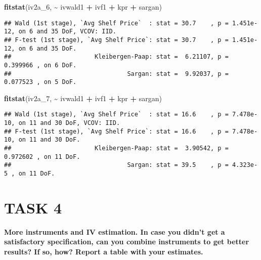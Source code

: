 \documentclass[
]{article}
\newenvironment{Shaded}{\begin{snugshade}}{\end{snugshade}}
\newcommand{\FunctionTok}[1]{\textcolor[rgb]{0.13,0.29,0.53}{\textbf{#1}}}
\newcommand{\NormalTok}[1]{#1}
\newcommand{\SpecialCharTok}[1]{\textcolor[rgb]{0.81,0.36,0.00}{\textbf{#1}}}
\begin{document}
\begin{Shaded}
\begin{Highlighting}[]
\FunctionTok{fitstat}\NormalTok{(iv2a\_6, }\SpecialCharTok{\textasciitilde{}}\NormalTok{ ivwald1 }\SpecialCharTok{+}\NormalTok{ ivf1 }\SpecialCharTok{+}\NormalTok{ kpr }\SpecialCharTok{+}\NormalTok{ sargan)}
\end{Highlighting}
\end{Shaded}

\begin{verbatim}
## Wald (1st stage), `Avg Shelf Price`  : stat = 30.7    , p = 1.451e-12, on 6 and 35 DoF, VCOV: IID.
## F-test (1st stage), `Avg Shelf Price`: stat = 30.7    , p = 1.451e-12, on 6 and 35 DoF.
##                       Kleibergen-Paap: stat =  6.21107, p = 0.399966 , on 6 DoF.
##                                Sargan: stat =  9.92037, p = 0.077523 , on 5 DoF.
\end{verbatim}

\begin{Shaded}
\begin{Highlighting}[]
\FunctionTok{fitstat}\NormalTok{(iv2a\_7, }\SpecialCharTok{\textasciitilde{}}\NormalTok{ ivwald1 }\SpecialCharTok{+}\NormalTok{ ivf1 }\SpecialCharTok{+}\NormalTok{ kpr }\SpecialCharTok{+}\NormalTok{ sargan)}
\end{Highlighting}
\end{Shaded}

\begin{verbatim}
## Wald (1st stage), `Avg Shelf Price`  : stat = 16.6    , p = 7.478e-10, on 11 and 30 DoF, VCOV: IID.
## F-test (1st stage), `Avg Shelf Price`: stat = 16.6    , p = 7.478e-10, on 11 and 30 DoF.
##                       Kleibergen-Paap: stat =  3.90542, p = 0.972602 , on 11 DoF.
##                                Sargan: stat = 39.5    , p = 4.323e-5 , on 11 DoF.
\end{verbatim}

\section{TASK 4}\label{task-4}

\textbf{More instruments and IV estimation. In case you didn't get a
satisfactory specification, can you combine instruments to get better
results? If so, how? Report a table with your estimates.}
\end{document}
